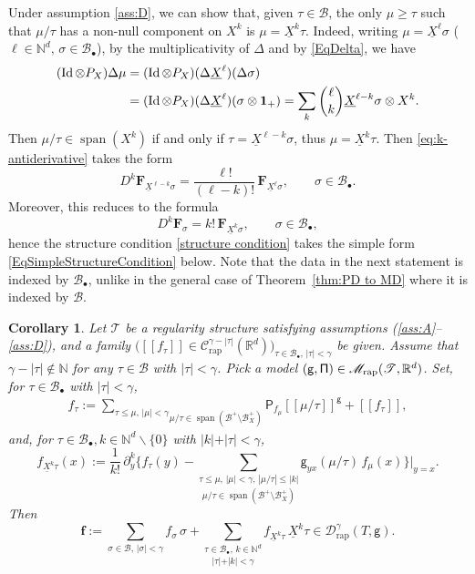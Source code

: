 \documentclass[10pt]{amsart}
\newcommand{\sbullet}{{\scriptscriptstyle\bullet}}
\DeclareMathOperator{\Span}{span}
\theoremstyle{plain}
\newtheorem{cor}[thm]{Corollary}
\theoremstyle{definition}
\DeclareMathOperator{\iden}{Id}
\newcommand{\Brac}[1]{[\![#1]\!]}
\newcommand{\bsf}{\boldsymbol{f}}
\newcommand{\rap}{\mathrm{rap}}
\newcommand{\sfP}{\mathsf{P}}
\newcommand{\sfg}{\mathsf{g}}
\newcommand{\bsF}{\boldsymbol{F}}
\newcommand{\scrM}{\mathscr{M}}
\newcommand{\scrT}{\mathscr{T}}
\newcommand{\bbN}{\mathbb{N}}
\newcommand{\bbR}{\mathbb{R}}
\newcommand{\mcB}{\mathcal{B}}
\newcommand{\mcC}{\mathcal{C}}
\newcommand{\mcD}{\mathcal{D}}
\begin{document}
Under assumption \eqref{ass:D}, we can show that, given $\tau\in\mcB$, the only $\mu\geq \tau$ such that $\mu/\tau$ has a non-null component on $X^k$ is $\mu=\underline{X}^k\tau$. Indeed, writing $\mu=\underline{X}^\ell\sigma$ ($\ell\in\bbN^d,\,\sigma\in\mcB_\sbullet$), by the multiplicativity of $\Delta$ and by \eqref{EqDelta}, we have
\begin{align*}
(\iden \otimes P_X)\Delta\mu
&=(\iden \otimes P_X)(\Delta\underline{X}^\ell)(\Delta\sigma)\\
&=(\iden \otimes P_X)(\Delta\underline{X}^\ell)(\sigma\otimes{\bf1}_+)
=\sum_{k}\binom{\ell}{k}\underline{X}^{\ell-k}\sigma\otimes X^{k}.
\end{align*}
Then $\mu/\tau\in\Span (X^k)$ if and only if $\tau=\underline{X}^{\ell-k}\sigma$, thus $\mu=\underline{X}^k\tau$.
Then \eqref{eq:k-antiderivative} takes the form
\[
D^k\bsF_{\underline{X}^{\ell-k}\sigma}=\frac{\ell!}{(\ell-k)!}\,\bsF_{\underline{X}^\ell\sigma},\qquad\sigma\in\mcB_\sbullet.
\]
Moreover, this reduces to the formula
\[
D^k\bsF_\sigma = k! \,\bsF_{\underline{X}^k\sigma},\qquad\sigma\in\mcB_\sbullet,
\]
hence the structure condition \eqref{structure condition} takes the simple form \eqref{EqSimpleStructureCondition} below. Note that the data in the next statement is indexed by $\mcB_\sbullet$, unlike in the general case of Theorem~\ref{thm:PD to MD} where it is indexed by $\mcB$.

\begin{cor} \label{thm:PD to MD2}
Let $\scrT$ be a regularity structure satisfying assumptions \textup{(\ref{ass:A}--\ref{ass:D})}, and a family $\bigl(\Brac{f_\tau}\in \mcC_\rap^{\gamma-|\tau|}(\bbR^d)\bigr)_{\tau\in\mcB_\sbullet,\,\vert\tau\vert<\gamma}$ be given. Assume that $\gamma-|\tau|\notin\bbN$ for any $\tau\in\mcB$ with $|\tau|<\gamma$. Pick a model ${\sf (g,\Pi)}\in\scrM_\rap(\scrT,\bbR^d)$. Set, for $\tau\in\mcB_\sbullet$ with $\vert\tau\vert<\gamma$,
\begin{align*}
f_\tau := \underset{\mu/\tau\in\Span (\mcB^+\setminus\mcB^+_X)}{\sum_{\tau\leq\mu, \,|\mu|<\gamma}} \sfP_{f_\mu}\Brac{\mu/\tau}^\sfg + \Brac{f_\tau},
\end{align*}
and, for $\tau\in\mcB_\sbullet, k\in\bbN^d\backslash\{0\}$ with $\vert k\vert+\vert\tau\vert<\gamma$,
\begin{equation} \label{EqSimpleStructureCondition}
f_{\underline{X}^k\tau}(x) :=
\frac1{k!}\,
\partial_y^k\bigg\{f_\tau(y) -
\underset{\mu/\tau\in\Span (\mcB^+\setminus\mcB^+_X)}{\sum_{\tau\leq\mu, \,|\mu|<\gamma,\, |\mu/\tau|\le|k|}}
\sfg_{yx}(\mu/\tau)\,f_\mu(x)\bigg\}\Big|_{y=x}.
\end{equation}
Then
\[
\bsf := \sum_{\sigma\in\mcB,\, \vert\sigma\vert<\gamma}f_\sigma\,\sigma + \underset{\vert\tau\vert+\vert k\vert<\gamma}{\sum_{\tau\in\mcB_\sbullet,\, k\in\bbN^d}} f_{\underline{X}^k\tau}\,\underline{X}^k\tau\in\mcD_\rap^{\gamma}(T, \sfg).
\]
\end{cor}
\end{document}
